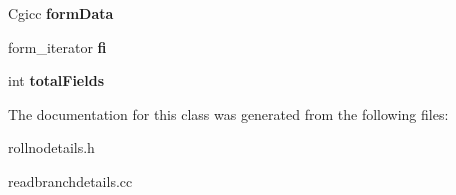 \begin{DoxyCompactItemize}
\item 
\hypertarget{classReadBranchDetails_a7bb99a6ec821f098371df4cb65ab8f65}{Cgicc {\bfseries form\-Data}}\label{classReadBranchDetails_a7bb99a6ec821f098371df4cb65ab8f65}

\item 
\hypertarget{classReadBranchDetails_a6ffffa42ad379f516a3419496469a0d6}{form\-\_\-iterator {\bfseries fi}}\label{classReadBranchDetails_a6ffffa42ad379f516a3419496469a0d6}

\item 
\hypertarget{classReadBranchDetails_afc1d050b96d76aa1e3a8f31a39f7658b}{int {\bfseries total\-Fields}}\label{classReadBranchDetails_afc1d050b96d76aa1e3a8f31a39f7658b}

\end{DoxyCompactItemize}


The documentation for this class was generated from the following files\-:\begin{DoxyCompactItemize}
\item 
rollnodetails.\-h\item 
readbranchdetails.\-cc\end{DoxyCompactItemize}
